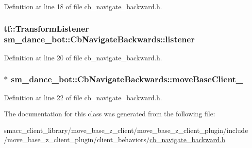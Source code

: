 Definition at line 18 of file cb\+\_\+navigate\+\_\+backward.\+h.

\subsubsection[{\texorpdfstring{listener}{listener}}]{\setlength{\rightskip}{0pt plus 5cm}tf\+::\+Transform\+Listener sm\+\_\+dance\+\_\+bot\+::\+Cb\+Navigate\+Backwards\+::listener}\hypertarget{classsm__dance__bot_1_1CbNavigateBackwards_a4ec9af0d5b94c5e0654a768c36bec85b}{}\label{classsm__dance__bot_1_1CbNavigateBackwards_a4ec9af0d5b94c5e0654a768c36bec85b}


Definition at line 20 of file cb\+\_\+navigate\+\_\+backward.\+h.

\subsubsection[{\texorpdfstring{move\+Base\+Client\+\_\+}{moveBaseClient_}}]{$\ast$ sm\+\_\+dance\+\_\+bot\+::\+Cb\+Navigate\+Backwards\+::move\+Base\+Client\+\_\+}\hypertarget{classsm__dance__bot_1_1CbNavigateBackwards_a8dea4225f55f14bf0a941baae383b07f}{}\label{classsm__dance__bot_1_1CbNavigateBackwards_a8dea4225f55f14bf0a941baae383b07f}


Definition at line 22 of file cb\+\_\+navigate\+\_\+backward.\+h.



The documentation for this class was generated from the following file\+:\begin{DoxyCompactItemize}
\item 
smacc\+\_\+client\+\_\+library/move\+\_\+base\+\_\+z\+\_\+client/move\+\_\+base\+\_\+z\+\_\+client\+\_\+plugin/include/move\+\_\+base\+\_\+z\+\_\+client\+\_\+plugin/client\+\_\+behaviors/\hyperlink{smacc__client__library_2move__base__z__client_2move__base__z__client__plugin_2include_2move__basef18dba82c6c9ec751438c97ecb125e5}{cb\+\_\+navigate\+\_\+backward.\+h}\end{DoxyCompactItemize}
